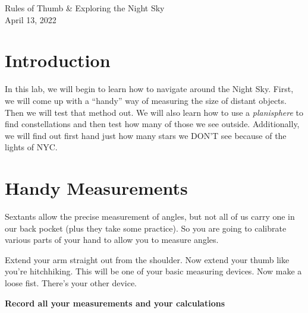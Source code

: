 \documentclass[11pt]{article}
\begin{document}
\begin{center}
\huge{Rules of Thumb \& Exploring the Night Sky}\\ \medskip \Large{April 13, 2022}
\end{center}

\section{Introduction}

In this lab, we will begin to learn how to navigate around the Night Sky.  First, we will come up with a ``handy'' way of measuring the size of distant objects.  Then we will test that method out.  We will also learn how to use a \textit{planisphere} to find constellations and then test how many of those we see outside.  Additionally, we will find out first hand just how many stars we DON'T see because of the lights of NYC.

\section{Handy Measurements}

Sextants allow the precise measurement of angles, but not all of us carry one in our back pocket (plus they take some practice). So you are going to calibrate various parts of your hand to allow you to measure angles.

\medskip \noindent
Extend your arm straight out from the shoulder. Now extend your thumb like you're hitchhiking. This will be one of your basic measuring devices. Now make a loose fist. There's your other device.

\medskip \noindent
\textbf{Record all your measurements and your calculations}
\end{document}
